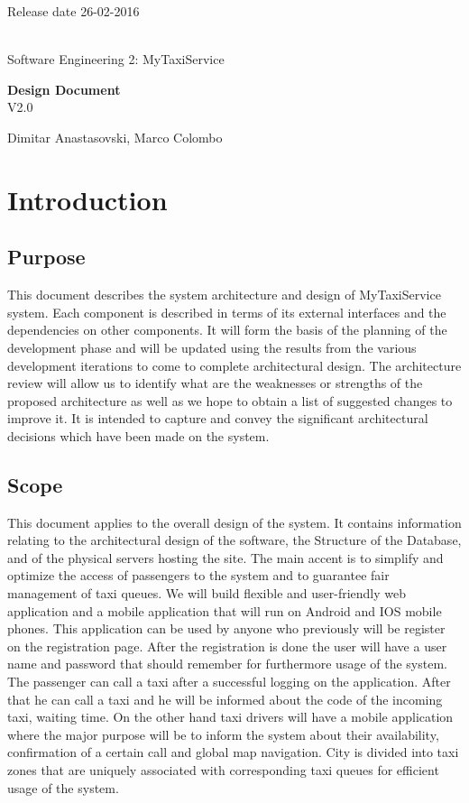 \documentclass[12pt, oneside]{book}   	%
\begin{document}
\thispagestyle{empty}
\hspace{10cm}
Release date 26-02-2016
\\
\\
\begin{center}
{\huge Software Engineering 2:}
{\huge MyTaxiService}
\end{center}
\vspace*{\fill}
\begin{center}
\textbf{\huge Design Document} 
\\
\large{V2.0}
\end{center}
\vfill
\begin{center}
{\large Dimitar Anastasovski, Marco Colombo}
\end{center}
\clearpage
\pagestyle{plain}
\tableofcontents
\setcounter{page}{1}
\clearpage
\chapter{Introduction}
\section{Purpose}
This document describes the system architecture and design of MyTaxiService system. Each component is described in terms of its external interfaces and the dependencies on other components. It will form the basis of the planning of the development phase and will be updated using the results from the various development iterations to come to complete architectural design.  The architecture review will allow us to identify what are the weaknesses or strengths of the proposed architecture as well as we hope to obtain a list of suggested changes to improve it. It is intended to capture and convey the significant architectural decisions which have been made on the system.
\section{Scope}
This document applies to the overall design of the system. It contains information relating to the architectural design of the software, the Structure of the Database, and of the physical servers hosting the site.
The main accent is to simplify and optimize the access of passengers to the system and to guarantee fair management of taxi queues. We will build flexible and user-friendly web application and a mobile application that will run on Android and IOS mobile phones. This application can be used by anyone who previously will be register on the registration page. After the registration is done the user will have a user name and password that should remember for furthermore usage of the system. The passenger can call a taxi after a successful logging on the application. After that he can call a taxi and he will be informed about the code of the incoming taxi, waiting time. On the other hand taxi drivers will have a mobile application where the major purpose will be to inform the system about their availability, confirmation of a certain call and global map navigation.  City is divided into taxi zones that are uniquely associated with corresponding taxi queues for efficient usage of the system. 
\end{document}
